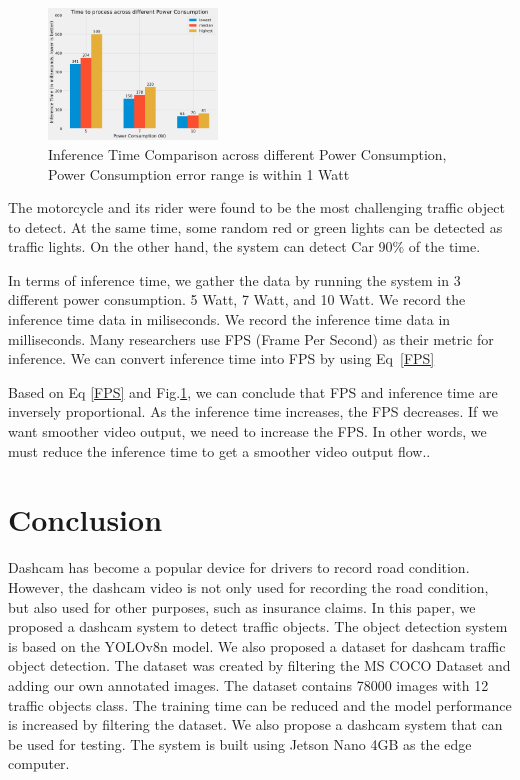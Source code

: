 \documentclass[conference]{IEEEtran}
\begin{document}
\begin{figure}[h!]
\centering
\includegraphics[width=0.4\textwidth,keepaspectratio]{inference_time_comparison.png}
\caption{Inference Time Comparison across different Power Consumption, Power Consumption error range is within 1 Watt}
\label{fig:inference_time_comparison}
\end{figure}
The motorcycle and its rider were found to be the most challenging traffic object to detect. At the same time, some random red or green lights can be detected as traffic lights.
On the other hand, the system can detect Car 90\% of the time.

In terms of inference time, we gather the data by running the system in 3 different power consumption. 5 Watt, 7 Watt, and 10 Watt. We record the inference time data in miliseconds.
We record the inference time data in milliseconds. Many researchers use FPS (Frame Per Second) as their metric for inference. We can convert inference time into FPS by using Eq~\eqref{FPS}

Based on Eq \eqref{FPS} and Fig.\ref{fig:inference_time_comparison}, we can conclude that FPS and inference time are inversely proportional. As the inference time increases, the FPS decreases. If we want smoother video output, we need to increase the FPS. In other words, we must reduce the inference time to get a smoother video output flow.\@.

\section{Conclusion}
Dashcam has become a popular device for drivers to record road condition. However, the dashcam video is not only used for recording the road condition, but also used for other purposes, such as insurance claims.
In this paper, we proposed a dashcam system to detect traffic objects. The object detection system is based on the YOLOv8n model. We also proposed a dataset for dashcam traffic object detection. The dataset was created by filtering the MS COCO Dataset and adding our own annotated images. The dataset contains 78000 images with 12 traffic objects class.
The training time can be reduced and the model performance is increased by filtering the dataset.
We also propose a dashcam system that can be used for testing. The system is built using Jetson Nano 4GB as the edge computer.
\end{document}
